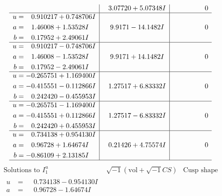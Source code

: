 \documentclass[1p]{elsarticle_modified}
\theoremstyle{definition}
\newcommand{\I}{\sqrt{-1}}
\begin{document}
$$\begin{array}{c|c|c}
 & \phantom{-}3.07720 + 5.07348 I & \phantom{-0.000000 } 0 \\ \hline\begin{aligned}
u &= \phantom{-}0.910217 + 0.748706 I \\
a &= \phantom{-}1.46008 + 1.53528 I \\
b &= \phantom{-}0.17952 + 2.49061 I\end{aligned}
 & \phantom{-}9.9171 - 14.1482 I & \phantom{-0.000000 } 0 \\ \hline\begin{aligned}
u &= \phantom{-}0.910217 - 0.748706 I \\
a &= \phantom{-}1.46008 - 1.53528 I \\
b &= \phantom{-}0.17952 - 2.49061 I\end{aligned}
 & \phantom{-}9.9171 + 14.1482 I & \phantom{-0.000000 } 0 \\ \hline\begin{aligned}
u &= -0.265751 + 1.169400 I \\
a &= -0.415551 - 0.112866 I \\
b &= \phantom{-}0.242420 - 0.455953 I\end{aligned}
 & \phantom{-}1.27517 + 6.83332 I & \phantom{-0.000000 } 0 \\ \hline\begin{aligned}
u &= -0.265751 - 1.169400 I \\
a &= -0.415551 + 0.112866 I \\
b &= \phantom{-}0.242420 + 0.455953 I\end{aligned}
 & \phantom{-}1.27517 - 6.83332 I & \phantom{-0.000000 } 0 \\ \hline\begin{aligned}
u &= \phantom{-}0.734138 + 0.954130 I \\
a &= \phantom{-}0.96728 + 1.64674 I \\
b &= -0.86109 + 2.13185 I\end{aligned}
 & \phantom{-}0.21426 + 4.75574 I & \phantom{-0.000000 } 0\\
 \hline 
 \end{array}$$\newpage$$\begin{array}{c|c|c}  
\text{Solutions to }I^u_{1}& \I (\text{vol} + \sqrt{-1}CS) & \text{Cusp shape}\\
 \hline 
\begin{aligned}
u &= \phantom{-}0.734138 - 0.954130 I \\
a &= \phantom{-}0.96728 - 1.64674 I \\

\end{aligned}
\end{array}$$
\end{document}
